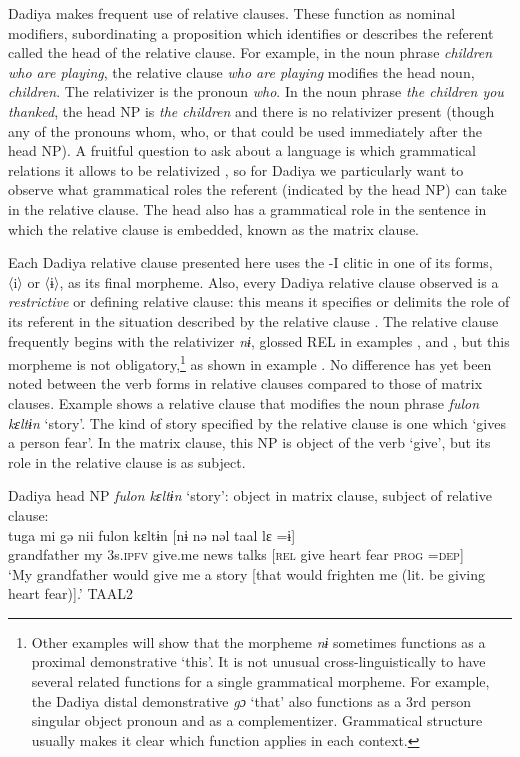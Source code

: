 \documentclass[output=paper]{langscibook}
\begin{document}
Dadiya makes frequent use of relative clauses. These function as nominal modifiers, subordinating a proposition which identifies or describes the referent called the head of the relative clause. For example, in the noun phrase \textit{children who are playing}, the relative clause \textit{who are playing} modifies the head noun, \textit{children}. The relativizer is the pronoun \textit{who}. In the noun phrase \textit{the children you thanked}, the head NP is \textit{the children} and there is no relativizer present (though any of the pronouns whom, who, or that could be used immediately after the head NP). A fruitful question to ask about a language is which grammatical relations it allows to be relativized \citep[326]{Payne1997}, so for Dadiya we particularly want to observe what grammatical roles the referent (indicated by the head NP) can take in the relative clause. The head also has a grammatical role in the sentence in which the relative clause is embedded, known as the matrix clause.

Each Dadiya relative clause presented here uses the -I clitic in one of its forms, 〈i〉 or 〈ɨ〉, as its final morpheme. Also, every Dadiya relative clause observed is a \textit{restrictive} or defining relative clause: this means it specifies or delimits the role of its referent in the situation described by the relative clause \citep[206]{Andrews2007}. The relative clause frequently begins with the relativizer \textit{nɨ}, glossed REL in examples ,  and , but this morpheme is not obligatory,\footnote{Other examples will show that the morpheme \textit{nɨ} sometimes functions as a proximal demonstrative `this'. It is not unusual cross-linguistically to have several related functions for a single grammatical morpheme. For example, the Dadiya distal demonstrative \textit{gɔ} `that' also functions as a 3rd person singular object pronoun and as a complementizer. Grammatical structure usually makes it clear which function applies in each context.} as shown in example . No difference has yet been noted between the verb forms in relative clauses compared to those of matrix clauses. Example  shows a relative clause that modifies the noun phrase \textit{fulon kɛltɨn} `story'. The kind of story specified by the relative clause is one which `gives a person fear'. In the matrix clause, this NP is object of the verb `give', but its role in the relative clause is as subject.

\ea Dadiya head NP \textit{fulon kɛltɨn} `story': object in matrix clause, subject of relative clause:
\label{ex:dettweiler:TAAL2} \\
\gll tuga mi gə nii fulon kɛltɨn [nɨ nə nəl taal lɛ =ɨ] \\
grandfather my 3s.\textsc{ipfv} give.me news talks [\textsc{rel} give heart fear \textsc{prog} =\textsc{dep}] \\
\glt `My grandfather would give me a story [that would frighten me (lit. be giving heart fear)].' TAAL2
\z
\end{document}
